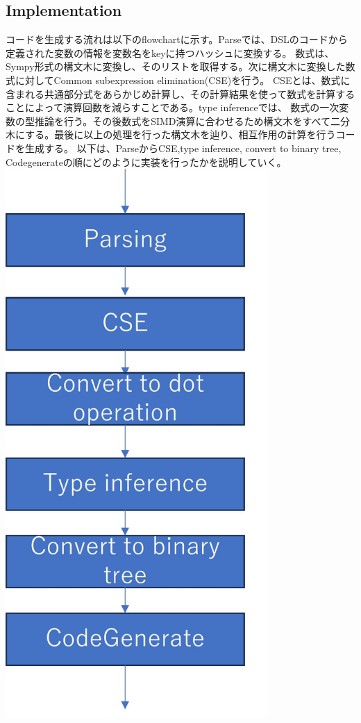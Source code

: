 \documentclass{jarticle}
\begin{document}
\subsection{Implementation}
コードを生成する流れは以下のflowchartに示す。Parseでは、DSLのコードから定義された変数の情報を変数名をkeyに持つハッシュに変換する。
数式は、Sympy形式の構文木に変換し、そのリストを取得する。次に構文木に変換した数式に対してCommon subexpression elimination(CSE)を行う。
CSEとは、数式に含まれる共通部分式をあらかじめ計算し、その計算結果を使って数式を計算することによって演算回数を減らすことである。type inferenceでは、
数式の一次変数の型推論を行う。その後数式をSIMD演算に合わせるため構文木をすべて二分木にする。最後に以上の処理を行った構文木を辿り、相互作用の計算を行うコードを生成する。
以下は、ParseからCSE,type inference, convert to binary tree, Codegenerateの順にどのように実装を行ったかを説明していく。
\includegraphics[width=100mm]{flowchartver3.jpg}
\end{document}
